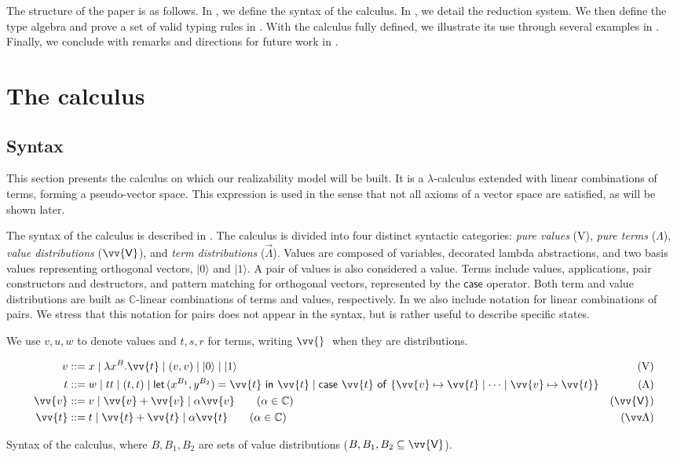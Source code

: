 \documentclass[runningheads,orivec,envcountsame,envcountsect]{llncs}
\newcommand\ket[1]{\ensuremath{|#1\rangle}}
\newcommand\s[1]{\ensuremath{\mathsf{#1}}}
\newcommand\Val{{\s V}}
\DeclareRobustCommand{\ValD}{\ensuremath{\vv{\mathsf{V}}}}
\def\C{\mathbb{C}}            %
\def\Val{\mathrm{V}}          %
\def\Pair#1#2{(#1,#2)} %
\def\Lam#1#2#3{\lambda#1^{#2}{.}#3} %
\def\letkeyword{\mathsf{let}}
\def\inkeyword{\mathsf{in}}
\def\LetP#1#2#3#4#5#6{\letkeyword\,\Pair{#1^{#2}}{#3^{#4}}=#5~\inkeyword~#6}
\def\gencase#1#2#3#4#5{\ensuremath{\mathsf{case}~#1~\mathsf{of}~\{#2\mapsto #4 \mid \dotsb \mid #3\mapsto #5\}}}
\begin{document}
The structure of the paper is as follows. In , we
define the syntax of the calculus. In , we detail
the reduction system. We then define the type algebra and prove a set of valid
typing rules in . With the calculus fully defined, we
illustrate its use through several examples in .
Finally, we conclude with remarks and directions for future work in
.

\section{The calculus}\label{sec:calculus}
\subsection{Syntax}

This section presents the calculus on which our realizability model will be
built. It is a $\lambda$-calculus extended with linear combinations of terms,
forming a pseudo-vector space. This expression is used in the sense that not
all axioms of a vector space are satisfied, as will be shown later.

The syntax of the calculus is described in
. The calculus is divided into four
distinct syntactic categories: \emph{pure values} ($\Val$), \emph{pure terms}
($\Lambda$), \emph{value distributions} ($\ValD$), and \emph{term
distributions} ($\vec\Lambda$). Values are composed of variables, decorated
lambda abstractions, and two basis values representing orthogonal vectors,
$\ket 0$ and $\ket 1$. A pair of values is also considered a value.  Terms
include values, applications, pair constructors and destructors, and pattern
matching for orthogonal vectors, represented by the $\mathsf{case}$ operator.
Both term and value distributions are built as $\C$-linear combinations of
terms and values, respectively. In 
we also include notation for linear combinations of
pairs. We stress that this notation for pairs does not appear in the syntax,
but is rather useful to describe specific states.

We use $v,u,w$ to denote values and $t,s,r$ for terms, writing $\vv{}\;$ when
they are distributions.

\begin{table}[t]
  \begin{align*}
    v &::= x \mid \Lam{x}B{\vv{t}} \mid (v, v) \mid \ket{0} \mid \ket{1} &
    (\Val)\\
    t &::= w \mid tt \mid (t,t) \mid
    \LetP{x}{B_1}{y}{B_2}{\vv{t}}{\vv{t}}\mid
    \gencase{\vv{t}}{\vv{v}}{\vv{v}}{\vv{t}}{\vv{t}} &
    (\Lambda) \\
    \vv{v} &::= v \mid \vv{v}+\vv{v} \mid \alpha \vv{v}
    \qquad\hfill(\alpha\in\C) & (\ValD) \\
    \vv{t} &::= t \mid \vv{t}+\vv{t} \mid \alpha \vv{t}
    \qquad\hfill(\alpha\in\C) & (\vv \Lambda)
  \end{align*}
  \caption{Syntax of the calculus, where $B, B_1, B_2$ are sets of value
  distributions ($B, B_1, B_2 \subseteq \ValD$).}
  \label{tab:Syntax}
\end{table}
\end{document}
